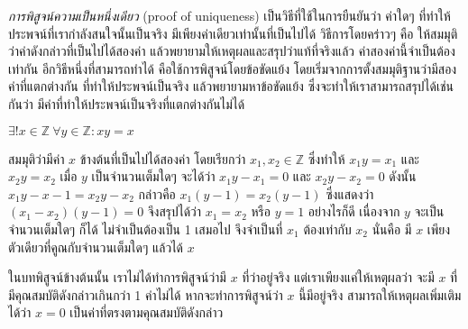 \emph{การพิสูจน์ความเป็นหนึ่งเดียว} (proof of uniqueness) เป็นวิธีที่ใช้ในการยืนยันว่า ค่าใดๆ ที่ทำให้ประพจน์ที่เรากำลังสนใจนั้นเป็นจริง มีเพียงค่าเดียวเท่านั้นที่เป็นไปได้ \enskip วิธีการโดยคร่าวๆ คือ ให้สมมุติว่าค่าดังกล่าวที่เป็นไปได้สองค่า แล้วพยายามให้เหตุผลและสรุปว่าแท้ที่จริงแล้ว ค่าสองค่านี้จำเป็นต้องเท่ากัน \enskip อีกวิธีหนึ่งที่สามารถทำได้ คือใช้การพิสูจน์โดยข้อขัดแย้ง โดยเริ่มจากการตั้งสมมุติฐานว่ามีสองค่าที่แตกต่างกัน ที่ทำให้ประพจน์เป็นจริง แล้วพยายามหาข้อขัดแย้ง ซึ่งจะทำให้เราสามารถสรุปได้เช่นกันว่า มีค่าที่ทำให้ประพจน์เป็นจริงที่แตกต่างกันไม่ได้

\begin{theorem}
$\exists! x\in\mathbb{Z}\ \forall y\in\mathbb{Z}: xy=x$
\begin{pf}
สมมุติว่ามีค่า $x$ ข้างต้นที่เป็นไปได้สองค่า โดยเรียกว่า $x_1,x_2\in\mathbb{Z}$ ซึ่งทำให้ $x_1y=x_1$ และ $x_2y=x_2$ เมื่อ $y$ เป็นจำนวนเต็มใดๆ \enskip จะได้ว่า $x_1y-x_1=0$ และ $x_2y-x_2=0$ \enskip ดังนั้น $x_1y-x-1=x_2y-x_2$ กล่าวคือ $x_1(y-1)=x_2(y-1)$ ซึ่งแสดงว่า $(x_1-x_2)(y-1)=0$ จึงสรุปได้ว่า $x_1=x_2$ หรือ $y=1$ \enskip อย่างไรก็ดี เนื่องจาก $y$ จะเป็นจำนวนเต็มใดๆ ก็ได้ ไม่จำเป็นต้องเป็น 1 เสมอไป จึงจำเป็นที่ $x_1$ ต้องเท่ากับ $x_2$ \enskip นั่นคือ มี $x$ เพียงตัวเดียวที่คูณกับจำนวนเต็มใดๆ แล้วได้ $x$
\end{pf}
ในบทพิสูจน์ข้างต้นนั้น เราไม่ได้ทำการพิสูจน์ว่ามี $x$ ที่ว่าอยู่จริง แต่เราเพียงแค่ให้เหตุผลว่า จะมี $x$ ที่มีคุณสมบัติดังกล่าวเกินกว่า 1 ค่าไม่ได้ \enskip หากจะทำการพิสูจน์ว่า $x$ นี้มีอยู่จริง สามารถให้เหตุผลเพิ่มเติมได้ว่า $x=0$ เป็นค่าที่ตรงตามคุณสมบัติดังกล่าว
\end{theorem}
